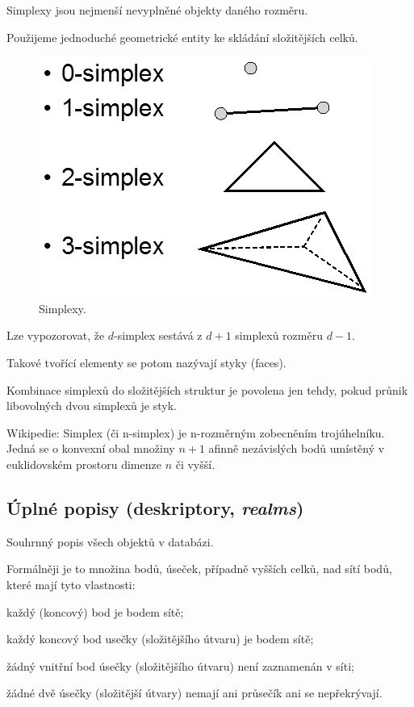 \begin{compactitem}
    \item Simplexy jsou nejmenší nevyplněné objekty daného rozměru.
    \item Použijeme jednoduché geometrické entity ke skládání složitějších celků.
    \begin{figure}[H]
        \centering
        \includegraphics[width=0.35\linewidth]{simplexy.png}
        \caption{Simplexy.}
    \end{figure}
    \item Lze vypozorovat, že $d$-simplex sestává z $d+1$ simplexů rozměru $d-1$.
    \item Takové tvořící elementy se potom nazývají styky (faces).
    \item Kombinace simplexů do složitějších struktur je povolena jen tehdy, pokud průnik libovolných dvou simplexů je styk.
    \item Wikipedie: Simplex (či n-simplex) je n-rozměrným zobecněním trojúhelníku. Jedná se o konvexní obal množiny $n+1$ afinně nezávislých bodů umístěný v euklidovském prostoru dimenze $n$ či vyšší.
\end{compactitem}

\subsection{Úplné popisy (deskriptory, \textit{realms})}

\begin{compactitem}
    \item Souhrnný popis všech objektů v databázi.
    \item Formálněji je to množina bodů, úseček, případně vyšších celků, nad sítí bodů, které mají tyto vlastnosti: \begin{compactitem}
        \item každý (koncový) bod je bodem sítě;
        \item každý koncový bod usečky (složitějšího útvaru) je bodem sítě;
        \item žádný vnitřní bod úsečky (složitějšího útvaru) není zaznamenán v síti;
        \item žádné dvě úsečky (složitější útvary) nemají ani průsečík ani se nepřekrývají.
    \end{compactitem}
\end{compactitem}

